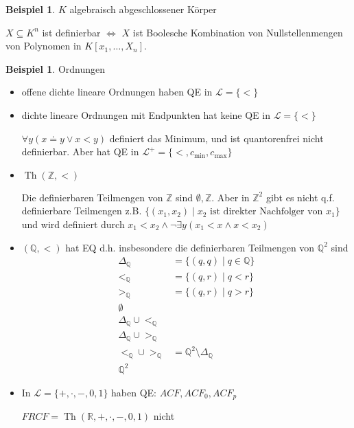 \documentclass[12pt,parskip=full]{scrartcl}
\newcommand{\setZ}{\mathbb{Z}}
\newcommand{\setQ}{\mathbb{Q}}
\newcommand{\setR}{\mathbb{R}}
\theoremstyle{definition}
\newtheorem{example}[theorem]{Beispiel}
\begin{document}
	\begin{example}
		$K$ algebraisch abgeschlossener Körper
		
		$X \subseteq K^n$ ist definierbar $\Leftrightarrow$ $X$ ist Boolesche Kombination von Nullstellenmengen von Polynomen in $K[x_1, \dots, X_n]$.
	\end{example}

	\begin{example}
		Ordnungen
		\begin{itemize}
			\item offene dichte lineare Ordnungen haben QE in $\mathcal{L} = \{ < \}$
			\item dichte lineare Ordnungen mit Endpunkten hat keine QE in $\mathcal{L} = \{ < \}$
			
			$\forall y (x \doteq y \lor x < y)$ definiert das Minimum, und ist quantorenfrei nicht definierbar. Aber hat QE in $\mathcal{L}^+ = \{ <, c_\text{min}, c_\text{max} \}$
			\item $\operatorname{Th}(\setZ, <)$
			
			Die definierbaren Teilmengen von $\setZ$ sind $\emptyset, \setZ$. Aber in $\setZ^2$ gibt es nicht q.f. definierbare Teilmengen z.B. $\{ (x_1, x_2) \mid \text{$x_2$ ist direkter Nachfolger von $x_1$} \}$ und wird definiert durch $x_1 < x_2 \land \lnot \exists y (x_1 < x \land x < x_2)$
			
			\item $(\setQ, <)$ hat EQ d.h. insbesondere die definierbaren Teilmengen von $\setQ^2$ sind
			\begin{align*}
				\Delta_\setQ &= \{ (q,q) \mid q \in \setQ \} \\
				<_\setQ &= \{ (q,r) \mid q < r \} \\
				>_\setQ &= \{ (q,r) \mid q > r \} \\
				\emptyset \\
				\Delta_\setQ \cup <_\setQ \\
				\Delta_\setQ \cup >_\setQ \\
				<_\setQ \cup >_\setQ &= \setQ^2 \setminus \Delta_\setQ \\
				\setQ^2
			\end{align*}
			\item In $\mathcal{L} = \{ +, \cdot, -, 0, 1 \}$ haben QE: $ACF, ACF_0, ACF_p$
			
			$FRCF = \operatorname{Th}(\setR, +, \cdot, -, 0, 1)$ nicht
		\end{itemize}
	\end{example}
\end{document}
